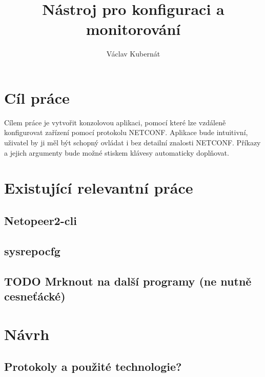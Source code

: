 \documentclass[thesis=B,czech]{FITthesis}[2019/03/06]
\title{Nástroj pro konfiguraci a monitorování}
\author{Václav Kubernát}
\begin{document}
\begin{introduction}



\end{introduction}


\chapter{Cíl práce} 
Cílem práce je vytvořit konzolovou aplikaci, pomocí které lze vzdáleně konfigurovat zařízení pomocí protokolu NETCONF\@. Aplikace bude intuitivní, uživatel by ji měl být schopný ovládat i bez detailní znalosti NETCONF\@. Příkazy a jejich argumenty bude možné stiskem klávesy automaticky doplňovat.


\chapter{Existující relevantní práce}
\section{Netopeer2-cli}
\section{sysrepocfg}
\section{TODO Mrknout na další programy (ne nutně cesneťácké)}


\chapter{Návrh}

\section{Protokoly a použité technologie?}
\end{document}
